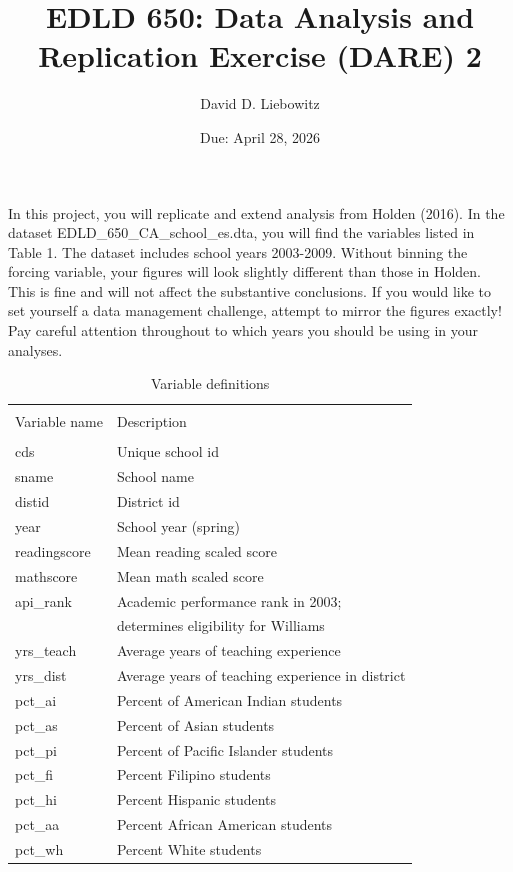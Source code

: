 \documentclass[a4paper, 11pt]{article}
\title{EDLD 650: Data Analysis and Replication Exercise (DARE) 2}
\author{David D. Liebowitz}
\date{Due: April 28, 2026}
\begin{document}
\maketitle

In this project, you will replicate and extend analysis from Holden (2016). In the dataset EDLD\_650\_CA\_school\_es.dta, you will find the variables listed in Table 1. The dataset includes school years 2003-2009. Without binning the forcing variable, your figures will look slightly different than those in Holden. This is fine and will not affect the substantive conclusions. If you would like to set yourself a data management challenge, attempt to mirror the figures exactly! Pay careful attention throughout to which years you should be using in your analyses.

\begin{table}[!htbp] \centering 
  \caption{Variable definitions} 
  \label{} 
\begin{tabular}{ll} 
\\[-1.8ex]\hline \hline
\\[-1.8ex] Variable name & Description \\ 
\hline \\[-1.8ex]
cds & Unique school id \\
sname & School name \\
distid & District id \\
year & School year (spring) \\
readingscore & Mean reading scaled score \\
mathscore & Mean math scaled score \\
api\_rank & Academic performance rank in 2003;  \\
 & determines eligibility for Williams \\
yrs\_teach & Average years of teaching experience \\
yrs\_dist & Average years of teaching experience in district \\
pct\_ai & Percent of American Indian students \\
pct\_as & Percent of Asian students \\
pct\_pi & Percent of Pacific Islander students \\
pct\_fi & Percent Filipino students  \\
pct\_hi & Percent Hispanic students \\
pct\_aa & Percent African American students \\
pct\_wh & Percent White students \\

\end{tabular}
\end{table}
\end{document}
